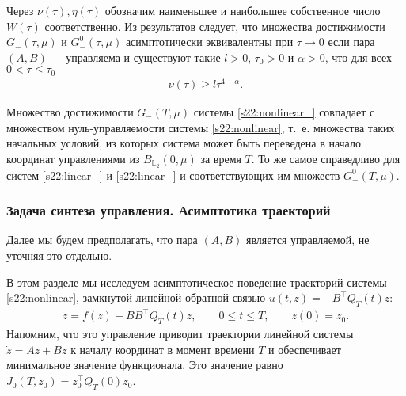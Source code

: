 \documentclass[../main.tex]{subfiles}
\begin{document}
Через $\nu(\tau), \eta(\tau)$ обозначим наименьшее и наибольшее собственное число $W(\tau)$ соответственно. 
Из результатов \cite{Polyak2001,GusevOsipovTrudy,Osipov,GusevMotor} следует, что множества достижимости 
$G_{-}(\tau,\mu)$ и $G_{-}^0(\tau,\mu)$ асимптотически эквивалентны при $\tau \to 0$ если пара $(A,B)$ --- управляема 
и существуют такие $ l > 0$, $\tau_0 > 0$ и $\alpha > 0$, что для всех $0 < \tau \leqslant \tau_0 $
 \begin{gather}\label{s22:gramas}
 \nu(\tau)\geqslant l\tau^{4-\alpha}.
 \end{gather}

\begin{zam}
 Множество достижимости $G_{-}(T,\mu)$ системы \eqref{s22:nonlinear_} совпадает с множеством нуль-управляемости системы \eqref{s22:nonlinear}, т.~е. множества таких начальных условий, из которых система может быть переведена в начало координат управлениями из $B_{\mathbb{L}_2}(0,\mu) $ за время $T$. 
 То же самое справедливо для систем \eqref{s22:linear_} и \eqref{s22:linear_} и соответствующих им множеств $G_{-}^0(T,\mu)$.
\end{zam}

\subsubsection{Задача синтеза управления. Асимптотика траекторий}

Далее мы будем предполагать, что пара $(A,B)$ является управляемой, не уточняя это отдельно.

В этом разделе мы исследуем асимптотическое поведение траекторий системы \eqref{s22:nonlinear}, замкнутой линейной обратной связью $ u(t,z) = -B^{\top} Q_T(t) z$:
\begin{gather}\label{s22:nonlinear_closed}
 \dot{z} = f(z) - B B^{\top} Q_T(t) z, \qquad 0 \leqslant t \leqslant T, \qquad z(0) = z_0.
\end{gather}
Напомним, что это управление приводит траектории линейной системы $\dot{z} = A z + B z$ к началу координат в момент времени $T$ и обеспечивает минимальное значение функционала. 
Это значение равно $J_0(T,z_0) =z_0^{\top}Q_T(0)z_0$.
\end{document}
